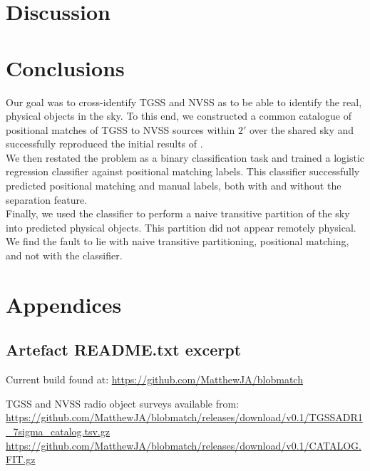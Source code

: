 \documentclass[12pt,a4paper]{article}
\begin{document}
\newpage
\section{Discussion}






\bigskip
\section{Conclusions}
Our goal was to cross-identify TGSS and NVSS as to be able to identify the real, physical objects in the sky. To this end, we constructed a common catalogue of positional matches of TGSS to NVSS sources within $\ang{;2;}$ over the shared sky and successfully reproduced the initial results of \citet{posmatchpaper}.\\

We then restated the problem as a binary classification task and trained a logistic regression classifier against positional matching labels. This classifier successfully predicted positional matching and manual labels, both with and without the separation feature.\\

Finally, we used the classifier to perform a naive transitive partition of the sky into predicted physical objects. This partition did not appear remotely physical. We find the fault to lie with naive transitive partitioning, positional matching, and not with the classifier.

\bigskip
\nocite{*}



\newpage
\section{Appendices}
\subsection{Artefact README.txt excerpt}
\label{app:artefact}
Current build found at:
\url{https://github.com/MatthewJA/blobmatch}

TGSS and NVSS radio object surveys available from:\\
\url{https://github.com/MatthewJA/blobmatch/releases/download/v0.1/TGSSADR1_7sigma_catalog.tsv.gz}\\
\url{https://github.com/MatthewJA/blobmatch/releases/download/v0.1/CATALOG.FIT.gz}
\end{document}
